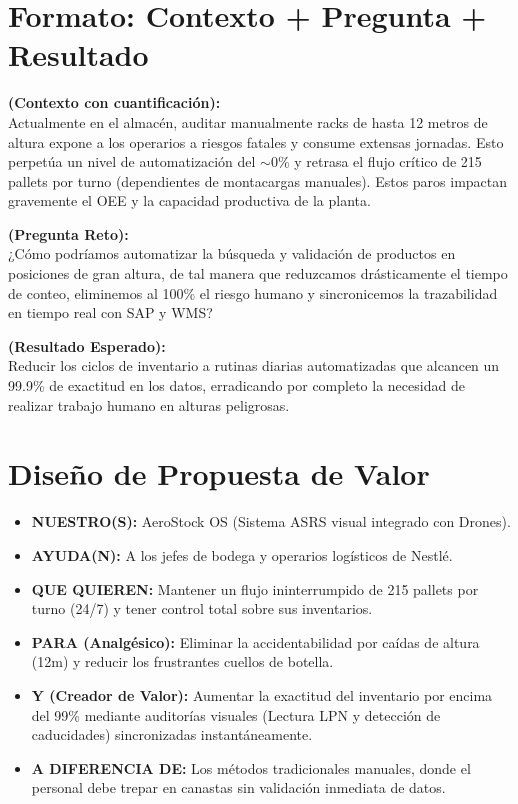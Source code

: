 \documentclass[12pt, a4paper]{article}
\begin{document}
\section{Formato: Contexto + Pregunta + Resultado}

\begin{highlightbox}
\textbf{(Contexto con cuantificación):} \\
Actualmente en el almacén, auditar manualmente racks de hasta 12 metros de altura expone a los operarios a riesgos fatales y consume extensas jornadas. Esto perpetúa un nivel de automatización del $\sim$0\% y retrasa el flujo crítico de 215 pallets por turno (dependientes de montacargas manuales). Estos paros impactan gravemente el OEE y la capacidad productiva de la planta.
\end{highlightbox}

\begin{highlightbox}
\textbf{(Pregunta Reto):} \\
¿Cómo podríamos automatizar la búsqueda y validación de productos en posiciones de gran altura, de tal manera que reduzcamos drásticamente el tiempo de conteo, eliminemos al 100\% el riesgo humano y sincronicemos la trazabilidad en tiempo real con SAP y WMS?
\end{highlightbox}

\begin{highlightbox}
\textbf{(Resultado Esperado):} \\
Reducir los ciclos de inventario a rutinas diarias automatizadas que alcancen un 99.9\% de exactitud en los datos, erradicando por completo la necesidad de realizar trabajo humano en alturas peligrosas.
\end{highlightbox}

\section{Diseño de Propuesta de Valor}

\begin{itemize}
    \item \textbf{NUESTRO(S):} AeroStock OS (Sistema ASRS visual integrado con Drones).
    \item \textbf{AYUDA(N):} A los jefes de bodega y operarios logísticos de Nestlé.
    \item \textbf{QUE QUIEREN:} Mantener un flujo ininterrumpido de 215 pallets por turno (24/7) y tener control total sobre sus inventarios.
    \item \textbf{PARA (Analgésico):} Eliminar la accidentabilidad por caídas de altura (12m) y reducir los frustrantes cuellos de botella.
    \item \textbf{Y (Creador de Valor):} Aumentar la exactitud del inventario por encima del 99\% mediante auditorías visuales (Lectura LPN y detección de caducidades) sincronizadas instantáneamente.
    \item \textbf{A DIFERENCIA DE:} Los métodos tradicionales manuales, donde el personal debe trepar en canastas sin validación inmediata de datos.
\end{itemize}
\end{document}

